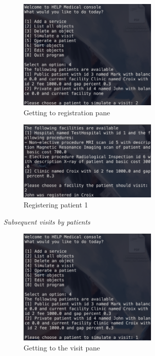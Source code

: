 \documentclass{article}
\begin{document}
	\begin{figure}
		\begin{center}
			\includegraphics[width=0.6\textwidth]{figures/Visiting/Register_patients_03.png}
		\end{center}
		\caption{Getting to registration pane}\label{fig:register_patients_03}
	\end{figure}

	\begin{figure}
		\begin{center}
			\includegraphics[width=0.6\textwidth]{figures/Visiting/Register_patients_04.png}
		\end{center}
		\caption{Registering patient 1}\label{fig:register_patients_04}
	\end{figure}


	\newpage 


	\textit{Subsequent visits by patients}
	\begin{figure}
		\begin{center}
			\includegraphics[width=0.6\textwidth]{figures/Visiting/Visit_with_patients_01.png}
		\end{center}
		\caption{Getting to the visit pane}\label{fig:visit_with_patients_01}
	\end{figure}
\end{document}
